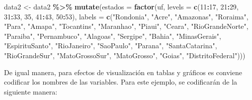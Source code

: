 \documentclass[
  spanish,
  12pt,
]{book}
\newenvironment{Shaded}{\begin{snugshade}}{\end{snugshade}}
\newcommand{\AttributeTok}[1]{\textcolor[rgb]{0.13,0.29,0.53}{#1}}
\newcommand{\DecValTok}[1]{\textcolor[rgb]{0.00,0.00,0.81}{#1}}
\newcommand{\FunctionTok}[1]{\textcolor[rgb]{0.13,0.29,0.53}{\textbf{#1}}}
\newcommand{\NormalTok}[1]{#1}
\newcommand{\OtherTok}[1]{\textcolor[rgb]{0.56,0.35,0.01}{#1}}
\newcommand{\SpecialCharTok}[1]{\textcolor[rgb]{0.81,0.36,0.00}{\textbf{#1}}}
\newcommand{\StringTok}[1]{\textcolor[rgb]{0.31,0.60,0.02}{#1}}
\begin{document}
\begin{Shaded}
\begin{Highlighting}[]
\NormalTok{data2 }\OtherTok{\textless{}{-}}\NormalTok{ data2 }\SpecialCharTok{\%\textgreater{}\%} 
         \FunctionTok{mutate}\NormalTok{(}\AttributeTok{estados =} \FunctionTok{factor}\NormalTok{(uf, }
                \AttributeTok{levels =} \FunctionTok{c}\NormalTok{(}\DecValTok{11}\SpecialCharTok{:}\DecValTok{17}\NormalTok{, }\DecValTok{21}\SpecialCharTok{:}\DecValTok{29}\NormalTok{, }\DecValTok{31}\SpecialCharTok{:}\DecValTok{33}\NormalTok{, }\DecValTok{35}\NormalTok{, }\DecValTok{41}\SpecialCharTok{:}\DecValTok{43}\NormalTok{, }\DecValTok{50}\SpecialCharTok{:}\DecValTok{53}\NormalTok{), }
                \AttributeTok{labels =} \FunctionTok{c}\NormalTok{(}\StringTok{"Rondonia"}\NormalTok{, }\StringTok{"Acre"}\NormalTok{, }\StringTok{"Amazonas"}\NormalTok{, }\StringTok{"Roraima"}\NormalTok{, }
                           \StringTok{"Para"}\NormalTok{, }\StringTok{"Amapa"}\NormalTok{, }\StringTok{"Tocantins"}\NormalTok{, }\StringTok{"Maranhao"}\NormalTok{, }
                           \StringTok{"Piaui"}\NormalTok{, }\StringTok{"Ceara"}\NormalTok{, }\StringTok{"RioGrandeNorte"}\NormalTok{, }\StringTok{"Paraiba"}\NormalTok{,}
                           \StringTok{"Pernambuco"}\NormalTok{, }\StringTok{"Alagoas"}\NormalTok{, }\StringTok{"Sergipe"}\NormalTok{, }\StringTok{"Bahia"}\NormalTok{, }
                           \StringTok{"MinasGerais"}\NormalTok{, }\StringTok{"EspirituSanto"}\NormalTok{, }\StringTok{"RioJaneiro"}\NormalTok{, }
                           \StringTok{"SaoPaulo"}\NormalTok{, }\StringTok{"Parana"}\NormalTok{, }\StringTok{"SantaCatarina"}\NormalTok{, }
                           \StringTok{"RioGrandeSur"}\NormalTok{, }\StringTok{"MatoGrossoSur"}\NormalTok{, }\StringTok{"MatoGrosso"}\NormalTok{, }
                           \StringTok{"Goias"}\NormalTok{, }\StringTok{"DistritoFederal"}\NormalTok{)))}
\end{Highlighting}
\end{Shaded}

De igual manera, para efectos de visualización en tablas y gráficos es conviene codificar los nombres de las variables. Para este ejemplo, se codificarán de la siguiente manera:
\end{document}
